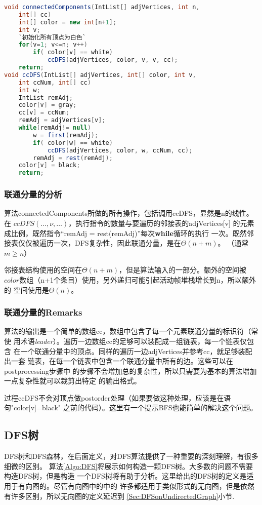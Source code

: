 \begin{lstlisting}[language={Java},keywordstyle=\color{blue!70}, commentstyle=\color{red!50!green!50!blue!50}]
void connectedComponents(IntList[] adjVertices, int n,
    int[] cc)
    int[] color = new int[n+1];
    int v;
    `初始化所有顶点为白色`
    for(v=1; v<=n; v++)
        if( color[v] == white)
            ccDFS(adjVertices, color, v, v, cc);
    return;
void ccDFS(IntList[] adjVertices, int[] color, int v,
    int ccNum, int[] cc)
    int w;
    IntList remAdj;
    color[v] = gray;
    cc[v] = ccNum;
    remAdj = adjVertices[v];
    while(remAdj!= null)
        w = first(remAdj);
        if( color[w] == white)
            ccDFS(adjVertices, color, w, ccNum, cc);
        remAdj = rest(remAdj);
    color[v] = black;
    return;
\end{lstlisting}

\subsubsection{联通分量的分析}
算法connectedComponents所做的所有操作，包括调用ccDFS，显然是n的线性。在
$ccDFS(\ldots, \nu, \ldots)$，执行指令的数量与要遍历的邻接表的adjVertices[v]
的元素成比例，既然指令“remAdj = rest(remAdj)”每次\textbf{while}循环的执行
一次。既然邻接表仅仅被遍历一次，DFS复杂性，因此联通分量，是在$\Theta(n+m)$。
（通常$m\geq n$）\

邻接表结构使用的空间在$\Theta(n+m)$，但是算法输入的一部分。额外的空间被
$color$数组（n+1个条目）使用，另外递归可能引起活动帧堆栈增长到n，所以额外的
空间使用是$\Theta(n)$。


\subsubsection{联通分量的Remarks}
算法的输出是一个简单的数组cc，数组中包含了每一个元素联通分量的标识符（常使
用术语\emph{leader}）。遍历一边数组cc的足够可以装配成一组链表，每一个链表仅包含
在一个联通分量中的顶点。同样的遍历一边adjVertices并参考cc，就足够装配出一套
链表，在每一个链表中包含一个联通分量中所有的边。这些可以在postprocessing步骤中
的步骤不会增加总的复杂性，所以只需要为基本的算法增加一点复杂性就可以裁剪出特定
的输出格式。

过程ccDFS不会对顶点做postorder处理（如果要做这种处理，应该是在语句"color[v]=black"
之前的代码）。这里有一个提示BFS也能简单的解决这个问题。

\subsection{DFS树}\label{Sec:DFS_Trees}
DFS树和DFS森林，在后面定义，对DFS算法提供了一种重要的深刻理解，有很多细微的区别。
算法\ref{Algo:DFS}将展示如何构造一颗DFS树。大多数的问题不需要构造DFS树，但是构造
一个DFS树将有助于分析。这里给出的DFS树的定义是适用于有向图的。尽管有向图中的中的
许多都适用于类似形式的无向图，但是依然有许多区别，所以无向图的定义延迟到
\ref{Sec:DFSonUndirectedGraph}小节.

